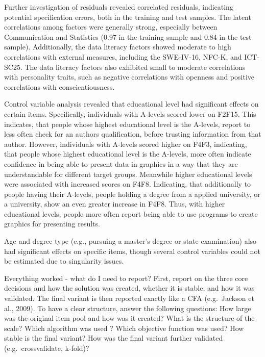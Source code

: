 \documentclass[
  12pt,
  a4paper,
  twoside]{article}
\begin{document}
Further investigation of residuals revealed correlated residuals, indicating potential specification errors, both in the training and test samples. The latent correlations among factors were generally strong, especially between Communication and Statistics (0.97 in the training sample and 0.84 in the test sample). Additionally, the data literacy factors showed moderate to high correlations with external measures, including the SWE-IV-16, NFC-K, and ICT-SC25. The data literacy factors also exhibited small to moderate correlations with personality traits, such as negative correlations with openness and positive correlations with conscientiousness.

Control variable analysis revealed that educational level had significant effects on certain items. Specifically, individuals with A-levels scored lower on F2F15. This indicates, that people whose highest educational level is the A-levels, report to less often check for an authors qualification, before trusting information from that author.
However, individuals with A-levels scored higher on F4F3, indicating, that people whose highest educational level is the A-levels, more often indicate confidence in being able to present data in graphics in a way that they are understandable for different target groups.
Meanwhile higher educational levels were associated with increased scores on F4F8. Indicating, that additionally to people having their A-levels, people holding a degree from a applied university, or a university, show an even greater increase in F4F8. Thus, with higher educational levels, people more often report being able to use programs to create graphics for presenting results.

Age and degree type (e.g., pursuing a master's degree or state examination) also had significant effects on specific items, though several control variables could not be estimated due to singularity issues.

Everything worked - what do I need to report?
First, report on the three core decisions and how the solution was created, whether it is stable, and how it was validated. The final variant is then reported exactly like a CFA (e.g.~Jackson et al., 2009). To have a clear structure, answer the following questions:
How large was the original item pool and how was it created?
What is the structure of the scale?
Which algorithm was used ?
Which objective function was used?
How stable is the final variant?
How was the final variant further validated (e.g.~crossvalidate, k-fold)?
\end{document}
